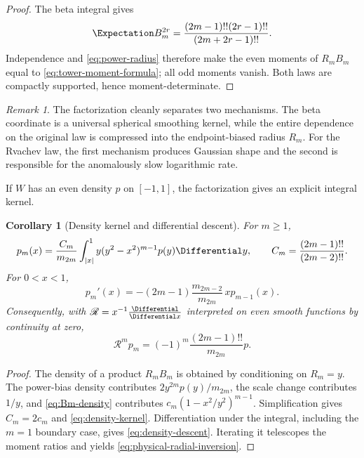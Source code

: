\documentclass[11pt,oneside]{article}
\newtheorem{corollary}[theorem]{Corollary}
\theoremstyle{definition}
\theoremstyle{remark}
\newtheorem{remark}[theorem]{Remark}
\begin{document}
\begin{proof}
The beta integral gives
\begin{equation}
 \Expectation B_m^{2r}
 =\frac{(2m-1)!!(2r-1)!!}{(2m+2r-1)!!}.             \label{eq:Bm-moments}
\end{equation}
Independence and \eqref{eq:power-radius} therefore make the even moments of
$R_mB_m$ equal to \eqref{eq:tower-moment-formula}; all odd moments vanish.
Both laws are compactly supported, hence moment-determinate.
\end{proof}

\begin{remark}
The factorization cleanly separates two mechanisms.  The beta coordinate is a
universal spherical smoothing kernel, while the entire dependence on the
original law is compressed into the endpoint-biased radius $R_m$.  For the
Rvachev law, the first mechanism produces Gaussian shape and the second is
responsible for the anomalously slow logarithmic rate.
\end{remark}

If $W$ has an even density $p$ on $[-1,1]$, the factorization gives an explicit
integral kernel.

\begin{corollary}[Density kernel and differential descent]
\label{cor:density-kernel}
For $m\ge1$,
\begin{equation}
 p_m(x)=\frac{C_m}{m_{2m}}
 \int_{|x|}^{1}y(y^2-x^2)^{m-1}p(y)\Differential y,
 \qquad
 C_m=\frac{(2m-1)!!}{(2m-2)!!}.                    \label{eq:density-kernel}
\end{equation}
For $0<x<1$,
\begin{equation}
 p_m'(x)=-(2m-1)\frac{m_{2m-2}}{m_{2m}}\,x p_{m-1}(x).
                                                               \label{eq:density-descent}
\end{equation}
Consequently, with $\mathscr R=x^{-1}\frac{\Differential}{\Differential x}$ interpreted on even
smooth functions by continuity at zero,
\begin{equation}
 \mathscr R^m p_m
 =(-1)^m\frac{(2m-1)!!}{m_{2m}}p.                  \label{eq:physical-radial-inversion}
\end{equation}
\end{corollary}

\begin{proof}
The density of a product $R_mB_m$ is obtained by conditioning on $R_m=y$.
The power-bias density contributes $2y^{2m}p(y)/m_{2m}$, the scale change
contributes $1/y$, and \eqref{eq:Bm-density} contributes
$c_m(1-x^2/y^2)^{m-1}$.  Simplification gives
$C_m=2c_m$ and \eqref{eq:density-kernel}.  Differentiation under the integral,
including the $m=1$ boundary case, gives \eqref{eq:density-descent}.  Iterating
it telescopes the moment ratios and yields
\eqref{eq:physical-radial-inversion}.
\end{proof}
\end{document}
